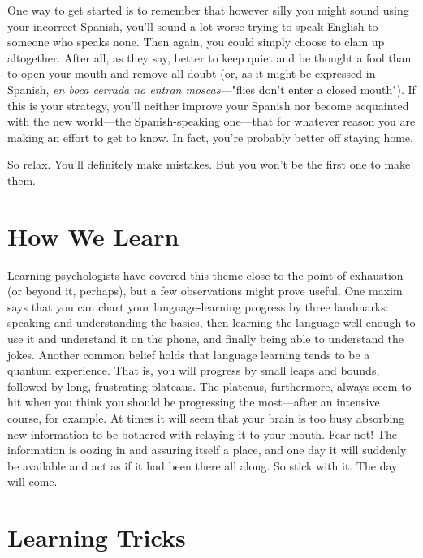 One way to get started is to remember that however silly you
might sound using your incorrect Spanish, you'll sound a lot worse trying to speak English to someone who speaks none. Then again, you
could simply choose to clam up altogether. After all, as they say, better
to keep quiet and be thought a fool than to open your mouth and remove all doubt (or, as it might be expressed in Spanish, \emph{en boca cerrada no entran moscas}---"flies don't enter a closed mouth"). If this
is your strategy, you'll neither improve your Spanish nor become acquainted with the new world---the Spanish-speaking one---that for
whatever reason you are making an effort to get to know. In fact, you're
probably better off staying home.

So relax. You'll definitely make mistakes. But you won't be the
first one to make them.

\section{How We Learn}

Learning psychologists have covered this theme close to the
point of exhaustion (or beyond it, perhaps), but a few observations
might prove useful. One maxim says that you can chart your language-learning progress by three landmarks: speaking and understanding the
basics, then learning the language well enough to use it and understand it on the phone, and finally being able to understand the jokes.
Another common belief holds that language learning tends to be a
quantum experience. That is, you will progress by small leaps and
bounds, followed by long, frustrating plateaus. The plateaus, furthermore, always seem to hit when you think you should be progressing
the most---after an intensive course, for example. At times it will
seem that your brain is too busy absorbing new information to be
bothered with relaying it to your mouth. Fear not! The information is
oozing in and assuring itself a place, and one day it will suddenly be
available and act as if it had been there all along. So stick with it. The
day will come.

\section{Learning Tricks}

